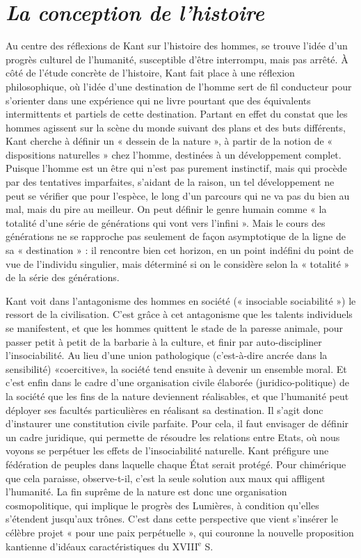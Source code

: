 
\section{{\it La conception de l’histoire}}

Au centre des réflexions de Kant sur
l’histoire des hommes, se trouve l’idée
d’un progrès culturel de l’humanité, susceptible
d’être interrompu, mais pas
arrêté. À côté de l’étude concrète de l’histoire,
Kant fait place à une réflexion philosophique,
où l’idée d’une destination de
l'homme sert de fil conducteur pour
s'orienter dans une expérience qui ne
livre pourtant que des équivalents intermittents
et partiels de cette destination.
Partant en effet du constat que les
hommes agissent sur la scène du monde
suivant des plans et des buts différents,
Kant cherche à définir un « dessein de la
nature », à partir de la notion de « dispositions
naturelles » chez l’homme, destinées
à un développement complet. Puisque
l'homme est un être qui n’est pas purement
instinctif, mais qui procède par des
tentatives imparfaites, s’aidant de la raison,
un tel développement ne peut se vérifier
que pour l’espèce, le long d’un
parcours qui ne va pas du bien au mal,
mais du pire au meilleur. On peut définir
le genre humain comme « la totalité d’une
série de générations qui vont vers l’infini ».
Mais le cours des générations ne se
rapproche pas seulement de façon asymptotique
de la ligne de sa « destination » :
il rencontre bien cet horizon, en un point
indéfini du point de vue de l’individu singulier,
mais déterminé si on le considère
selon la « totalité » de la série des générations.

Kant voit dans l’antagonisme des
hommes en société (« insociable sociabilité »)
le ressort de la civilisation. C’est
grâce à cet antagonisme que les talents
individuels se manifestent, et que les
hommes quittent le stade de la paresse
animale, pour passer petit à petit de la
barbarie à la culture, et finir par auto-discipliner
l’insociabilité. Au lieu d’une
union pathologique (c’est-à-dire ancrée
dans la sensibilité) «coercitive», la
société tend ensuite à devenir un
ensemble moral. Et c’est enfin dans le
cadre d’une organisation civile élaborée
(juridico-politique) de la société que les
fins de la nature deviennent réalisables, et
que l’humanité peut déployer ses facultés
particulières en réalisant sa destination. Il
s’agit donc d’instaurer une constitution
civile parfaite. Pour cela, il faut envisager
de définir un cadre juridique, qui permette
de résoudre les relations entre
Etats, où nous voyons se perpétuer les
effets de l’insociabilité naturelle. Kant
préfigure une fédération de peuples dans
laquelle chaque État serait protégé. Pour
chimérique que cela paraisse, observe-t-il,
c’est la seule solution aux maux qui affligent
l'humanité. La fin suprême de la
nature est donc une organisation cosmopolitique,
qui implique le progrès des
Lumières, à condition qu’elles s’étendent
jusqu'aux trônes. C’est dans cette perspective
que vient s’insérer le célèbre projet
« pour une paix perpétuelle », qui
couronne la nouvelle proposition kantienne
d’idéaux caractéristiques du
{\footnotesize XVIII}$^\text{e}$ S.

